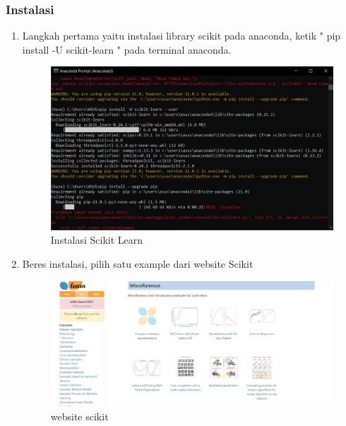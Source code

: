 \subsubsection{Instalasi}
\begin{enumerate}
		\item Langkah pertama yaitu instalasi library scikit pada anaconda, ketik " pip install -U scikit-learn " pada terminal anaconda. 

		\begin{figure}[H]
		\centering
		\includegraphics[width=1\textwidth]{figures/1184095/chapter1/Capture.JPG}
		\caption{Instalasi Scikit Learn}
		\label{print}
		\end{figure}
		
        \item{Beres instalasi, pilih satu example dari website Scikit}
        \begin{figure}[H]
		\centering
		\includegraphics[width=1\textwidth]{figures/1184095/chapter1/4.JPG}
		\caption{website scikit}
		\label{print}
		\end{figure}
		

\end{enumerate}

